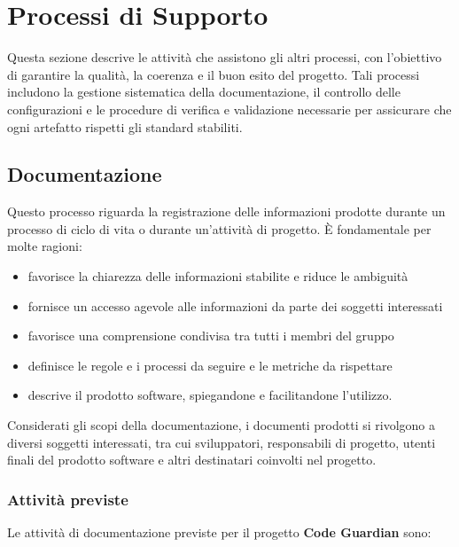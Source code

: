 \documentclass[12pt, a4paper]{article}
\begin{document}
\newpage
\section{Processi di Supporto}

Questa sezione descrive le attività che assistono gli altri processi, con l'obiettivo di garantire la qualità, la coerenza e il buon esito del progetto. Tali processi includono la gestione sistematica della documentazione, il controllo delle configurazioni e le procedure di verifica e validazione necessarie per assicurare che ogni artefatto rispetti gli standard stabiliti.

\subsection{Documentazione}

Questo processo riguarda la registrazione delle informazioni prodotte durante un processo di ciclo di vita o durante un'attività di progetto. È fondamentale per molte ragioni:

\begin{itemize}
    \item favorisce la chiarezza delle informazioni stabilite e riduce le ambiguità
    \item fornisce un accesso agevole alle informazioni da parte dei soggetti interessati
    \item favorisce una comprensione condivisa tra tutti i membri del gruppo
    \item definisce le regole e i processi da seguire e le metriche da rispettare
    \item descrive il prodotto software, spiegandone e facilitandone l'utilizzo.
\end{itemize}

Considerati gli scopi della documentazione, i documenti prodotti si rivolgono a diversi soggetti interessati, tra cui sviluppatori, responsabili di progetto, utenti finali del prodotto software e altri destinatari coinvolti nel progetto.

\subsubsection{Attività previste}

Le attività di documentazione previste per il progetto \textbf{Code Guardian} sono:
\end{document}
